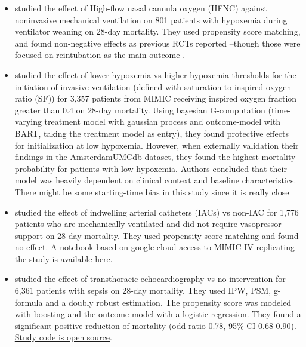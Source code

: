 \documentclass[10pt,letterpaper]{article}
\begin{document}
\begin{itemize}[leftmargin=2ex]
    \item \cite{liu2021effects} studied the effect of \textcolor{I}{High-flow
              nasal cannula oxygen (HFNC)} against \textcolor{C}{noninvasive
              mechanical ventilation} on \textcolor{P}{801 patients with hypoxemia
              during ventilator weaning} on \textcolor{O}{28-day mortality}. They
          used propensity score matching, and found non-negative effects as
          previous RCTs reported --though those were focused on reintubation as the
          main outcome \cite{stephan2015high,hernandez2016effect}.

    \item \cite{yarnell2023oxygenation} studied the effect of \textcolor{I}{lower hypoxemia} vs \textcolor{C}{higher
          hypoxemia thresholds for the initiation of invasive ventilation} (defined with saturation-to-inspired oxygen ratio (SF)) for
          \textcolor{P}{3,357 patients from MIMIC receiving inspired oxygen fraction greater than 0.4} on \textcolor{O}{28-day
              mortality}. Using bayesian G-computation (time-varying treatment model with
          gaussian process and outcome-model with BART, taking the treatment model as
          entry), they found protective effects for initialization at low hypoxemia.
          However, when externally validation their findings in the AmsterdamUMCdb dataset,
          they found the highest mortality probability for patients with low hypoxemia.
          Authors concluded that their model was heavily dependent on clinical context
          and baseline characteristics. There might be some starting-time bias in this study since it is really close

    \item \cite{hsu2015association} studied the effect of \textcolor{I}{indwelling
              arterial catheters (IACs)} vs \textcolor{C}{non-IAC} for
          \textcolor{P}{1,776 patients who are mechanically ventilated and did
              not require vasopressor support} on \textcolor{O}{28-day mortality}.
          They used propensity score matching and found no effect. A notebook based on google cloud access to MIMIC-IV
          replicating the study is available \href{https://github.com/alistairewj/mimic-iv-aline-study/blob/main/mimic_iv_aline.ipynb}{here}.

    \item \cite{feng2018transthoracic} studied the effect of
          \textcolor{I}{transthoracic echocardiography} vs \textcolor{C}{no
              intervention} for \textcolor{P}{6,361 patients with sepsis} on
          \textcolor{O}{28-day mortality}. They used IPW, PSM, g-formula and a
          doubly robust estimation. The propensity score was modeled with boosting
          and the outcome model with a logistic regression. They
          found a significant positive reduction of mortality (odd ratio 0.78, 95\% CI 0.68-0.90).
          \href{https://github.com/nus-mornin-lab/echo-mimiciii}{Study code is
              open source}.


\end{itemize}
\end{document}
